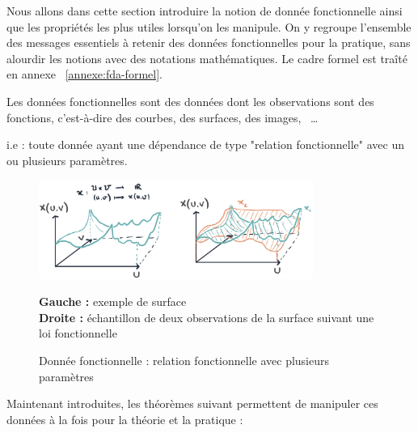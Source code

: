 
Nous allons dans cette section introduire la notion de donnée fonctionnelle ainsi que les propriétés les plus utiles lorsqu'on les manipule. On y regroupe l'ensemble des messages essentiels à retenir des données fonctionnelles pour la pratique, sans alourdir les notions avec des notations mathématiques. Le cadre formel est traîté en annexe ~\ref{annexe:fda-formel}.

\begin{definition*}
	Les données fonctionnelles sont des données dont les observations sont des fonctions, c'est-à-dire des courbes, des surfaces, des images, \, \dots

	\noindent i.e : toute donnée ayant une dépendance de type "relation fonctionnelle" avec un ou plusieurs paramètres.
	\label{def*:fda}
\end{definition*}

\begin{figure}[H]
	\begin{center}
		\includegraphics[width=0.8\textwidth]{Images/sketches/fda_surface.jpg}
	\end{center}

	{
	\textbf{Gauche :} exemple de surface
	\\
	\textbf{Droite :} échantillon de deux observations de la surface suivant une loi fonctionnelle}

	\caption{Donnée fonctionnelle : relation fonctionnelle avec plusieurs paramètres}
	\label{fig:sketch_surface}
\end{figure}

\noindent Maintenant introduites, les théorèmes suivant permettent de manipuler ces données à la fois pour la théorie et la pratique :

\begin{thm*}
	\noindent{}
	\label{thm*:KL}
\end{thm*}


